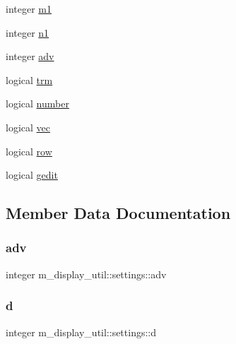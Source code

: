 \begin{DoxyCompactItemize}
\item 
integer \hyperlink{structm__display__util_1_1settings_a2d229d3d7fe7d0966aa24e2f1f69f058}{m1}
\item 
integer \hyperlink{structm__display__util_1_1settings_a2b84936048353b3a4069bc4add4afbd2}{n1}
\item 
integer \hyperlink{structm__display__util_1_1settings_a48f4987f23486c4d34452ea07536db12}{adv}
\item 
logical \hyperlink{structm__display__util_1_1settings_aee8aaeb4f69cc02bcbc0ef0cd524af52}{trm}
\item 
logical \hyperlink{structm__display__util_1_1settings_aa6d5b31c3417ac137c12ef56b413de2c}{number}
\item 
logical \hyperlink{structm__display__util_1_1settings_a26be17f3439b252cbff6b846ac1efd3c}{vec}
\item 
logical \hyperlink{structm__display__util_1_1settings_ac5f1655b41bc8d746a001b768e8e8621}{row}
\item 
logical \hyperlink{structm__display__util_1_1settings_af002794ad38662e2b56edce4f1a98d68}{gedit}
\end{DoxyCompactItemize}


\subsection{Member Data Documentation}
\mbox{\label{structm__display__util_1_1settings_a48f4987f23486c4d34452ea07536db12}} 
\subsubsection{\texorpdfstring{adv}{adv}}
{\footnotesize\ttfamily integer m\+\_\+display\+\_\+util\+::settings\+::adv\hspace{0.3cm}{\ttfamily [private]}}

\mbox{\label{structm__display__util_1_1settings_ae723b191970109c2e0885e92cab1d52f}} 
\subsubsection{\texorpdfstring{d}{d}}
{\footnotesize\ttfamily integer m\+\_\+display\+\_\+util\+::settings\+::d\hspace{0.3cm}{\ttfamily [private]}}

